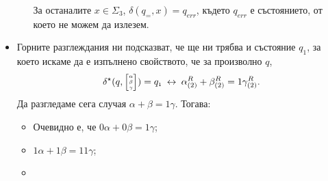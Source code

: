 \begin{hint}
\begin{itemize}
\begin{itemize}
      За останалите $x \in \Sigma_3$, $\delta(q_{\scriptscriptstyle{=}},x) = q_{err}$,
      където $q_{err}$ е състоянието, от което не можем да излезем.
    \end{itemize}
  \item
    Горните разглеждания ни подсказват, че ще ни трябва и състояние $q_1$, за което искаме да е изпълнено свойството,
    че за произволно $q$,
    \[\delta^\star(q, \tiny{ \begin{bmatrix} \alpha\\ \beta \\ \gamma\end{bmatrix} }) = q_{\scriptscriptstyle{1}}  \iff \alpha^R_{(2)} + \beta^R_{(2)} = 1\gamma^R_{(2)}.\]
    Да разгледаме сега случая $\alpha + \beta = 1\gamma$. Тогава:
    \begin{itemize}
    \item 
      Очевидно е, че $0\alpha + 0\beta = 1\gamma$;
    \item
      $1\alpha + 1\beta = 11\gamma$;
    \item

\end{itemize}
\end{itemize}
\end{hint}
